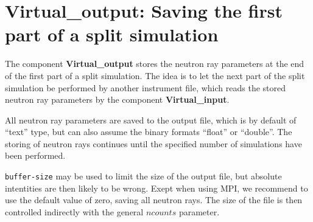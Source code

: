 \section{Virtual\_output: Saving the first part of a split simulation}
\label{virtual_output}


The component {\bf Virtual\_output} stores the neutron ray parameters
at the end of the first part of a split simulation. The idea is to let the
next part of the split simulation be performed by another instrument file,
which reads the stored neutron ray
parameters by the component {\bf Virtual\_input}.

All neutron ray parameters are saved to the output file, which is by default
of ``text'' type, but can also assume the binary formats
``float'' or ``double''. The storing of neutron rays continues until the
specified number of simulations have been performed.

\verb+buffer-size+ may be used to limit the size of the output file, but
absolute intentities are then likely to be wrong.
Exept when using MPI, we recommend to use the default value of zero, saving all neutron rays.
The size of the file is then controlled indirectly with the general $ncounts$ parameter.
